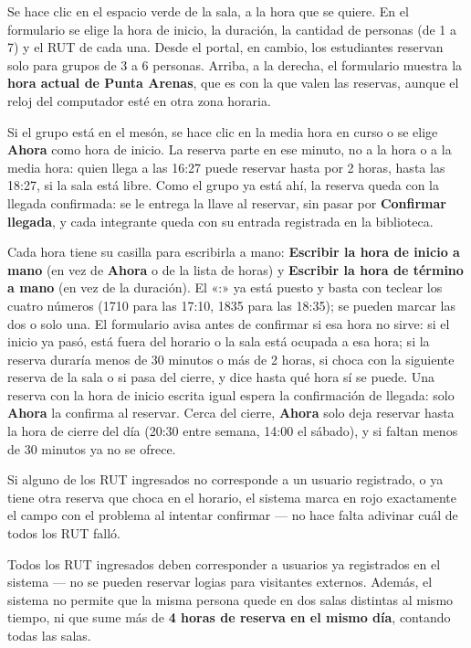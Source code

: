 \documentclass[11pt,a4paper]{report}
\begin{document}
Se hace clic en el espacio verde de la sala, a la hora que se quiere.
En el formulario se elige la hora de inicio, la duración, la cantidad de
personas (de 1 a 7) y el RUT de cada una. Desde el portal, en cambio, los
estudiantes reservan solo para grupos de 3 a 6 personas. Arriba, a la derecha,
el formulario muestra la \textbf{hora actual de Punta Arenas}, que es con la que
valen las reservas, aunque el reloj del computador esté en otra zona horaria.

Si el grupo está en el mesón, se hace clic en la media hora en curso o se
elige \textbf{Ahora} como hora de inicio. La reserva parte en ese minuto, no
a la hora o a la media hora: quien llega a las 16:27 puede reservar hasta por
2 horas, hasta las 18:27, si la sala está libre. Como el grupo ya está ahí,
la reserva queda con la llegada confirmada: se le entrega la llave al
reservar, sin pasar por \textbf{Confirmar llegada}, y cada integrante queda
con su entrada registrada en la biblioteca.

Cada hora tiene su casilla para escribirla a mano: \textbf{Escribir la hora
de inicio a mano} (en vez de \textbf{Ahora} o de la lista de horas) y
\textbf{Escribir la hora de término a mano} (en vez de la duración). El «:»
ya está puesto y basta con teclear los cuatro números (1710 para las 17:10,
1835 para las 18:35); se pueden marcar las dos o solo una. El formulario avisa antes de confirmar si esa
hora no sirve: si el inicio ya pasó, está fuera del horario o la sala está
ocupada a esa hora; si la reserva duraría menos de 30 minutos o más de 2
horas, si choca con la siguiente reserva de la sala o si pasa del cierre, y
dice hasta qué hora sí se puede. Una reserva con la hora de inicio escrita
igual espera la confirmación de llegada: solo \textbf{Ahora} la confirma al
reservar. Cerca del cierre, \textbf{Ahora} solo deja
reservar hasta la hora de cierre del día (20:30 entre semana, 14:00 el sábado),
y si faltan menos de 30 minutos ya no se ofrece.


Si alguno de los RUT ingresados no corresponde a un usuario registrado,
o ya tiene otra reserva que choca en el horario, el sistema marca en
rojo exactamente el campo con el problema al intentar confirmar --- no
hace falta adivinar cuál de todos los RUT falló.

\begin{importante}
Todos los RUT ingresados deben corresponder a usuarios ya registrados en
el sistema --- no se pueden reservar logias para visitantes externos.
Además, el sistema no permite que la misma persona quede en dos salas
distintas al mismo tiempo, ni que sume más de \textbf{4 horas de reserva
en el mismo día}, contando todas las salas.
\end{importante}
\end{document}

